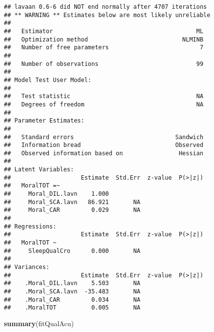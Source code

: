 \documentclass[
]{book}
\newenvironment{Shaded}{\begin{snugshade}}{\end{snugshade}}
\newcommand{\KeywordTok}[1]{\textcolor[rgb]{0.13,0.29,0.53}{\textbf{#1}}}
\newcommand{\NormalTok}[1]{#1}
\begin{document}
\begin{verbatim}
## lavaan 0.6-6 did NOT end normally after 4707 iterations
## ** WARNING ** Estimates below are most likely unreliable
## 
##   Estimator                                         ML
##   Optimization method                           NLMINB
##   Number of free parameters                          7
##                                                       
##   Number of observations                            99
##                                                       
## Model Test User Model:
##                                                       
##   Test statistic                                    NA
##   Degrees of freedom                                NA
## 
## Parameter Estimates:
## 
##   Standard errors                             Sandwich
##   Information bread                           Observed
##   Observed information based on                Hessian
## 
## Latent Variables:
##                    Estimate  Std.Err  z-value  P(>|z|)
##   MoralTOT =~                                         
##     Moral_DIL.lavn    1.000                           
##     Moral_SCA.lavn   86.921       NA                  
##     Moral_CAR         0.029       NA                  
## 
## Regressions:
##                    Estimate  Std.Err  z-value  P(>|z|)
##   MoralTOT ~                                          
##     SleepQualCro      0.000       NA                  
## 
## Variances:
##                    Estimate  Std.Err  z-value  P(>|z|)
##    .Moral_DIL.lavn    5.503       NA                  
##    .Moral_SCA.lavn  -35.483       NA                  
##    .Moral_CAR         0.034       NA                  
##    .MoralTOT          0.005       NA
\end{verbatim}

\begin{Shaded}
\begin{Highlighting}[]
\KeywordTok{summary}\NormalTok{(fitQualAcu)}
\end{Highlighting}
\end{Shaded}
\end{document}

